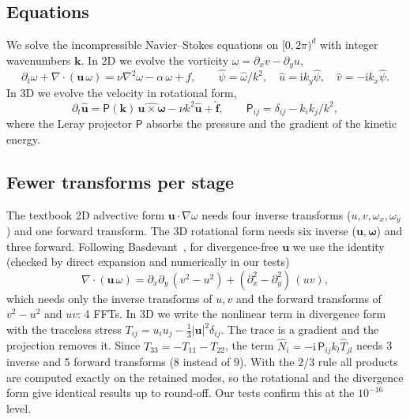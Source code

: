 \documentclass[11pt]{article}
\begin{document}
\subsection{Equations}
We solve the incompressible Navier--Stokes equations on $[0,2\pi)^d$ with integer wavenumbers
$\mathbf{k}$. In 2D we evolve the vorticity $\omega=\partial_x v-\partial_y u$,
\begin{equation}
\partial_t\omega + \nabla\cdot(\mathbf{u}\,\omega) = \nu\nabla^2\omega - \alpha\,\omega + f,
\qquad \hat\psi = \hat\omega/k^2,\quad \hat u = \mathrm{i}k_y\hat\psi,\quad
\hat v=-\mathrm{i}k_x\hat\psi .
\end{equation}
In 3D we evolve the velocity in rotational form,
\begin{equation}
\partial_t\hat{\mathbf u} = \mathsf P(\mathbf k)\,\widehat{\mathbf u\times\boldsymbol\omega}
 - \nu k^2\hat{\mathbf u} + \hat{\mathbf f},\qquad
 \mathsf P_{ij}=\delta_{ij}-k_ik_j/k^2,
\end{equation}
where the Leray projector $\mathsf P$ absorbs the pressure and the gradient of the kinetic
energy.

\subsection{Fewer transforms per stage}
The textbook 2D advective form $\mathbf u\cdot\nabla\omega$ needs four inverse transforms
($u,v,\omega_x,\omega_y$) and one forward transform. The 3D rotational form needs six inverse
($\mathbf u,\boldsymbol\omega$) and three forward. Following Basdevant~\cite{basdevant1983technical},
for divergence-free $\mathbf u$ we use the identity (checked by direct expansion and
numerically in our tests)
\begin{equation}
\nabla\cdot(\mathbf u\,\omega) = \partial_x\partial_y\,(v^2-u^2) + (\partial_x^2-\partial_y^2)\,(uv),
\end{equation}
which needs only the inverse transforms of $u,v$ and the forward transforms of $v^2-u^2$ and
$uv$: 4 FFTs. In 3D we write the nonlinear term in divergence form with the traceless stress
$T_{ij}=u_iu_j-\tfrac13|\mathbf u|^2\delta_{ij}$. The trace is a gradient and the projection
removes it. Since $T_{33}=-T_{11}-T_{22}$, the term
$\hat N_i=-\mathrm i\,\mathsf P_{ij}k_l\hat T_{jl}$ needs 3 inverse and 5 forward transforms
(8 instead of 9). With the 2/3 rule all products are computed exactly on the retained modes,
so the rotational and the divergence form give identical results up to round-off. Our
tests confirm this at the $10^{-16}$ level.
\end{document}
